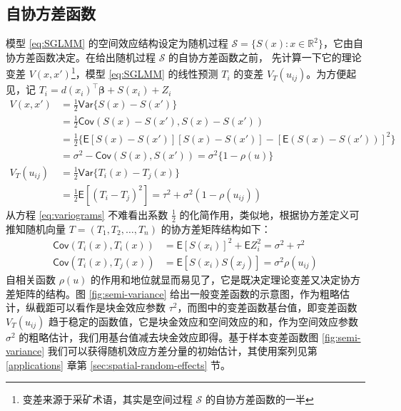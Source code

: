 \documentclass[12pt,a4paper,UTF8,twoside]{book}
\theoremstyle{definition}
\theoremstyle{definition}
\theoremstyle{definition}
\theoremstyle{remark}
\begin{document}
\hypertarget{subsec:covariance-function}{%
\subsection{自协方差函数}\label{subsec:covariance-function}}

模型 \eqref{eq:SGLMM} 的空间效应结构设定为随机过程
\(\mathcal{S} = \{S(x): x \in \mathbb{R}^2\}\)，它由自协方差函数决定。在给出随机过程
\(\mathcal{S}\) 的自协方差函数之前， 先计算一下它的理论变差
\(V(x,x')\)\footnote{变差来源于采矿术语，其实是空间过程 \(\mathcal{S}\)
  的自协方差函数的一半}，模型 \eqref{eq:SGLMM} 的线性预测 \(T_{i}\) 的变差
\(V_{T}(u_{ij})\)。为方便起见，记
\(T_{i} = d(x_i)^{\top}\boldsymbol{\beta} + S(x_i) + Z_i\)
\begin{equation}
\begin{aligned}
V(x,x') 
      &= \frac{1}{2}\mathsf{Var}\{S(x)-S(x')\}\\
      &= \frac{1}{2}\mathsf{Cov}(S(x)-S(x'),S(x)-S(x'))\\
      &= \frac{1}{2}\{\mathsf{E}[S(x)-S(x')][S(x)-S(x')]-[\mathsf{E}(S(x)-S(x'))]^2\}\\
      &= \sigma^2-\mathsf{Cov}(S(x),S(x'))=\sigma^2\{1-\rho(u)\}\\
V_{T}(u_{ij})
      &= \frac{1}{2}\mathsf{Var}\{T_{i}(x)-T_{j}(x)\} \\
      &= \frac{1}{2}\mathsf{E}[(T_{i}-T_{j})^2]=\tau^2+\sigma^2(1-\rho(u_{ij})) 
\end{aligned} \label{eq:variograms}
\end{equation} \noindent 从方程 \eqref{eq:variograms} 不难看出系数
\(\frac{1}{2}\) 的化简作用，类似地，根据协方差定义可推知随机向量
\(T = (T_1,T_2,\ldots,T_n)\) 的协方差矩阵结构如下： \begin{equation}
\begin{aligned}
\mathsf{Cov}(T_{i}(x),T_{i}(x)) &= \mathsf{E}[S(x_i)]^2 + \mathsf{E}Z_{i}^{2}= \sigma^2+\tau^2 \\
\mathsf{Cov}(T_{i}(x),T_{j}(x)) &= \mathsf{E}[S(x_i)S(x_j)]  = \sigma^2\rho(u_{ij})
\end{aligned}
\end{equation} \noindent 自相关函数 \(\rho(u)\)
的作用和地位就显而易见了，它是既决定理论变差又决定协方差矩阵的结构。图
\ref{fig:semi-variance}
给出一般变差函数的示意图，作为粗略估计，纵截距可以看作是块金效应参数
\(\tau^2\)，而图中的变差函数基台值，即变差函数 \(V_{T}(u_{ij})\)
趋于稳定的函数值，它是块金效应和空间效应的和，作为空间效应参数
\(\sigma^2\)
的粗略估计，我们用基台值减去块金效应即得。基于样本变差函数图
\ref{fig:semi-variance}
我们可以获得随机效应方差分量的初始估计，其使用案列见第
\ref{applications} 章第 \ref{sec:spatial-random-effects} 节。
\end{document}
